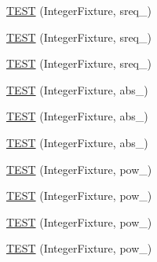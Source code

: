 \begin{DoxyCompactItemize}
\item 
\hyperlink{bmk447-TestInteger_8c_09_09_ae48927e927f71ad1b9c5ac37f6610b63}{T\-E\-S\-T} (Integer\-Fixture, sreq\-\_)
\item 
\hyperlink{bmk447-TestInteger_8c_09_09_a2d8a8775827539f8a6c7519764782a10}{T\-E\-S\-T} (Integer\-Fixture, sreq\-\_)
\item 
\hyperlink{bmk447-TestInteger_8c_09_09_a62d37ea779f02b8d4d39331a1baee704}{T\-E\-S\-T} (Integer\-Fixture, sreq\-\_)
\item 
\hyperlink{bmk447-TestInteger_8c_09_09_a67c6be927a65f050a850d57b8c62ba4e}{T\-E\-S\-T} (Integer\-Fixture, abs\-\_)
\item 
\hyperlink{bmk447-TestInteger_8c_09_09_a4a84e53aaa6ac60ae0c975f07a3d6d6d}{T\-E\-S\-T} (Integer\-Fixture, abs\-\_)
\item 
\hyperlink{bmk447-TestInteger_8c_09_09_a9ff96d62c1540bd68cfa98cf5e6f1c44}{T\-E\-S\-T} (Integer\-Fixture, abs\-\_)
\item 
\hyperlink{bmk447-TestInteger_8c_09_09_ac202bf13a21c16463a79d16f3151009b}{T\-E\-S\-T} (Integer\-Fixture, pow\-\_)
\item 
\hyperlink{bmk447-TestInteger_8c_09_09_afd294dcefff9809ee26b3f1fb1624a54}{T\-E\-S\-T} (Integer\-Fixture, pow\-\_)
\item 
\hyperlink{bmk447-TestInteger_8c_09_09_a0950d70a3cb56b8119f1f06bbe47adc8}{T\-E\-S\-T} (Integer\-Fixture, pow\-\_)
\item 
\hyperlink{bmk447-TestInteger_8c_09_09_a5480a05817d3837abf600a4c0d3859a6}{T\-E\-S\-T} (Integer\-Fixture, pow\-\_)
\end{DoxyCompactItemize}


